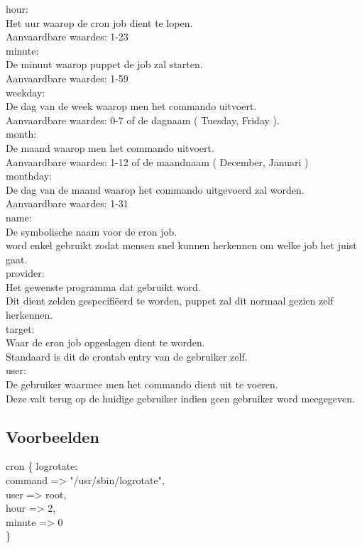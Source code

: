 hour:\\
Het uur waarop de cron job dient te lopen.\\
Aanvaardbare waardes: 1-23\\

minute:\\
De minuut waarop puppet de job zal starten.\\
Aanvaardbare waardes: 1-59\\

weekday:\\
De dag van de week waarop men het commando uitvoert.\\
Aanvaardbare waardes: 0-7 of de dagnaam ( Tuesday, Friday ).\\

month:\\
De maand waarop men het commando uitvoert.\\
Aanvaardbare waardes: 1-12 of de maandnaam ( December, Januari )\\

monthday:\\
De dag van de maand waarop het commando uitgevoerd zal worden.\\
Aanvaardbare waardes: 1-31\\

name:\\
De symbolische naam voor de cron job.\\
word enkel gebruikt zodat mensen snel kunnen herkennen om welke job het juist gaat.\\

provider:\\
Het gewenste programma dat gebruikt word.\\
Dit dient zelden gespecifi\"{e}erd te worden, puppet zal dit normaal gezien zelf herkennen.\\

target:\\
Waar de cron job opgeslagen dient te worden.\\
Standaard is dit de crontab entry van de gebruiker zelf.\\

user:\\
De gebruiker waarmee men het commando dient uit te voeren.\\
Deze valt terug op de huidige gebruiker indien geen gebruiker word meegegeven.\\

\subsection{Voorbeelden}
	cron \{ logrotate:\\
		command => "/usr/sbin/logrotate",\\
		user => root,\\
		hour => 2,\\
		minute => 0\\
	\}\\

